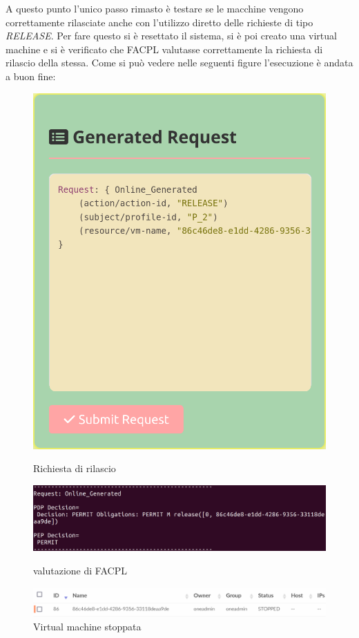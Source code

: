 A questo punto l'unico passo rimasto è testare se le macchine vengono correttamente rilasciate anche con l'utilizzo diretto delle richieste di tipo \emph{RELEASE}. Per fare questo si è resettato il sistema, si è poi creato una virtual machine e si è verificato che FACPL valutasse correttamente la richiesta di rilascio della stessa. Come si può vedere nelle seguenti figure l'esecuzione è andata a buon fine:
\begin{figure}[H]
    \centering
    \begin{minipage}{.5\textwidth}
        \centering
        \includegraphics[width=\textwidth]{tesi_screenshot/ReleaseP2.png}
        \caption{Richiesta di rilascio}
    \end{minipage}
    \begin{minipage}{\textwidth}
        \centering
        \includegraphics[width=\textwidth]{tesi_screenshot/permitRelease.png}
        \caption{valutazione di FACPL}
    \end{minipage}
    \par \medbreak
    \begin{minipage}{\textwidth}
        \centering
        \includegraphics[width=\textwidth]{tesi_screenshot/stoppedVM.png}
        \caption{Virtual machine stoppata}
    \end{minipage}
\end{figure}